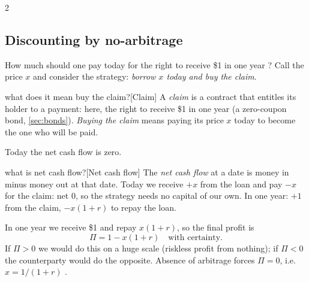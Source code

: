\begin{paracol}{2}
\subsection{Discounting by no-arbitrage}\label{sec:discounting}
How much should one pay today for the right to receive \$1 in one year ? Call
the price $x$ and consider the strategy: \emph{borrow $x$ today and buy the claim}.\begin{answer}{what does it mean buy the claim?}[Claim]
A \emph{claim} is a contract that entitles its holder to a payment: here, the right to receive
\$1 in one year (a zero-coupon bond, \cref{sec:bonds}). \emph{Buying the claim} means paying its price $x$
today to become the one who will be paid.
\end{answer} Today the
net cash flow is zero.\begin{answer}{what is net cash flow?}[Net cash flow]
The \emph{net cash flow} at a date is money in minus money
out at that date. Today we receive $+x$ from the loan and pay $-x$ for the claim: net $0$, so the
strategy needs no capital of our own. In one year: $+1$ from the claim, $-x(1+r)$ to repay the loan.
\end{answer} In one year we receive \$1 and repay $x(1+r)$, so the final profit is
\[
  \Pi = 1 - x(1+r) \quad\text{with certainty.}
\]
If $\Pi>0$ we would do this on a huge scale (riskless profit from nothing); if $\Pi<0$ the
counterparty would do the opposite. Absence of arbitrage forces $\Pi = 0$, i.e.
$x = 1/(1+r)$ .


\end{paracol}
